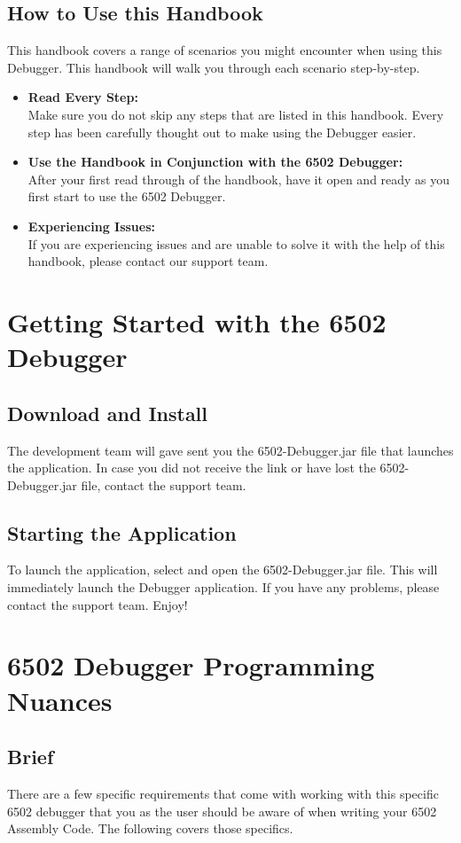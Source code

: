 \documentclass[a3paper, 11pt]{article}
\begin{document}
\subsection{How to Use this Handbook}
This handbook covers a range of scenarios you might encounter when using this Debugger. This handbook will walk you through each scenario step-by-step.
\begin{itemize}
	\item \textbf{Read Every Step:}\\
	Make sure you do not skip any steps that are listed in this handbook. Every step has been carefully thought out to make using the Debugger easier. 
	\item \textbf{Use the Handbook in Conjunction with the 6502 Debugger:}\\
	After your first read through of the handbook, have it open and ready as you first start to use the 6502 Debugger. 
	\item \textbf{Experiencing Issues:}\\
	If you are experiencing issues and are unable to solve it with the help of this handbook, please contact our support team. 
\end{itemize}
\pagebreak

\section{Getting Started with the 6502 Debugger}
\subsection{Download and Install}
The development team will gave sent you the 6502-Debugger.jar file that launches the application. In case you did not receive the link or have lost the 6502-Debugger.jar file, contact the support team. 
\subsection{Starting the Application}
To launch the application, select and open the 6502-Debugger.jar file. This will immediately launch the Debugger application. If you have any problems, please contact the support team. Enjoy!
\pagebreak

\section{6502 Debugger Programming Nuances}
\subsection{Brief}
There are a few specific requirements that come with working with this specific 6502 debugger that you as the user should be aware of when writing your 6502 Assembly Code. The following covers those specifics.
\end{document}
